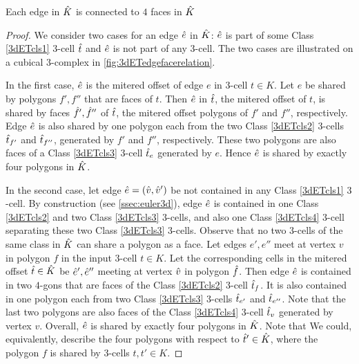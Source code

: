 \begin{lem}\label{lem:edgcnct4facs}
  Each edge in $\hat{K}$ is connected to $4$ faces in $\hat{K}$
\end{lem}
\begin{proof}
  We consider two cases for an edge $\hat{e}$ in $\hat{K}$: $\hat{e}$ is part of some Class \ref{3dETcls1} $3$-cell $\hat{t}$ and $\hat{e}$ is not part of any $3$-cell. %
  The two cases are illustrated on a cubical $3$-complex in \cref{fig:3dETedgefacerelation}.

  In the first case, $\hat{e}$ is the mitered offset of edge $e$ in $3$-cell $t \in K$.
  Let $e$ be shared by polygons $f',f''$ that are faces of $t$.
  Then $\hat{e}$ in $\hat{t}$, the mitered offset of $t$, is shared by faces $\hat{f}',\hat{f}''$ of $\hat{t}$, the mitered offset polygons of $f'$ and $f''$, respectively.
  Edge $\hat{e}$ is also shared by one polygon each from the two Class \ref{3dETcls2} $3$-cells $\hat{t}_{f'}$ and $\hat{t}_{f''}$, generated by $f'$ and $f''$, respectively.
  These two polygons are also faces of a Class \ref{3dETcls3} $3$-cell $\hat{t}_{e}$ generated by $e$.
  Hence $\hat{e}$ is shared by exactly four polygons in $\hat{K}$.


  In the second case, let edge $\hat{e} = (\hat{v}, \hat{v}')$ be not contained in any Class \ref{3dETcls1} $3$-cell.
  By construction (see \cref{ssec:euler3d}), edge $\hat{e}$ is contained in one Class \ref{3dETcls2} and two Class \ref{3dETcls3} $3$-cells, and also one Class \ref{3dETcls4} $3$-cell separating these two Class \ref{3dETcls3} $3$-cells.
  Observe that no two $3$-cells of the same class in $\hat{K}$ can share a polygon as a face.
  Let edges $e',e''$ meet at vertex $v$ in polygon $f$ in the input $3$-cell $t \in K$.
  Let the corresponding cells in the mitered offset $\hat{t} \in \hat{K}$ be $\hat{e}', \hat{e}''$ meeting at vertex $\hat{v}$ in polygon $\hat{f}$.
  Then edge $\hat{e}$ is contained in two $4$-gons that are faces of the Class \ref{3dETcls2} $3$-cell $\hat{t}_{f}$.
  It is also contained in one polygon each from two Class \ref{3dETcls3} $3$-cells $\hat{t}_{e'}$ and $\hat{t}_{e''}$.
  Note that the last two polygons are also faces of the Class \ref{3dETcls4} $3$-cell $\hat{t}_{v}$ generated by vertex $v$.
  Overall, $\hat{e}$ is shared by exactly four polygons in $\hat{K}$.
  Note that We could, equivalently, describe the four polygons with respect to $\hat{t}' \in \hat{K}$, where the polygon $f$ is shared by $3$-cells $t, t' \in K$.
\end{proof}
